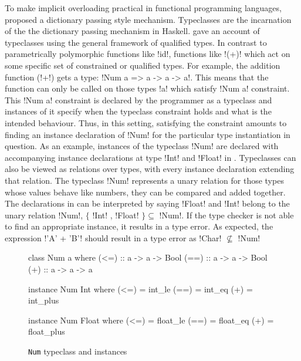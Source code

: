 \documentclass[manuscript,screen,nonacm]{acmart}
\begin{document}
To make implicit overloading practical in functional programming languages, \citet{wadler_polymorphism_1989} proposed a dictionary passing style mechanism. Typeclasses are the incarnation of the the dictionary passing mechanism in Haskell. \citet{jones_qualified_1994} gave an account of typeclasses using the general framework of qualified types. In contrast to parametrically polymorphic functions like !id!, functions like !(+)! which act on some specific set of constrained or qualified types. For example, the addition function (!+!) gets a type: !Num a => a -> a -> a!. This means that the function can only be called on those types !a! which satisfy !Num a! constraint. This !Num a! constraint is declared by the programmer as a typeclass and instances of it specify when the typeclass constraint holds and what is the intended behaviour. Thus, in this setting, satisfying the constraint amounts to finding an instance declaration of !Num! for the particular type instantiation in question. As an example, instances of the typeclass !Num! are declared with accompanying instance declarations at type !Int! and !Float! in . Typeclasses can also be viewed as relations over types, with every instance declaration extending that relation. The typeclass !Num! represents a unary relation for those types whose values behave like numbers, they can be compared and added together. The declarations in  can be interpreted by saying !Float! and !Int! belong to the unary relation !Num!, $\{$ !Int! , !Float! $\} \subseteq $ !Num!. If the type checker is not able to find an appropriate instance, it results in a type error. As expected, the expression !'A' + 'B'! should result in a type error as !Char! $\not\subseteq$ !Num!


\begin{figure}[ht]
\centering
\begin{minipage}[ht]{0.3\linewidth}
\begin{code}
class Num a where
  (<=) :: a -> a -> Bool
  (==) :: a -> a -> Bool
  (+) :: a -> a -> a
\end{code}
\end{minipage}%
\begin{minipage}[ht]{0.3\linewidth}
\begin{code}
instance Num Int where
  (<=) = int_le
  (==) = int_eq
  (+) = int_plus
\end{code}
\end{minipage}%
\begin{minipage}[ht]{0.3\linewidth}
\begin{code}
instance Num Float where
  (<=) = float_le
  (==) = float_eq
  (+) = float_plus
\end{code}
\end{minipage}
\caption{\lstinline{Num} typeclass and instances}
\label{fig:tc-num}
\end{figure}
\end{document}
